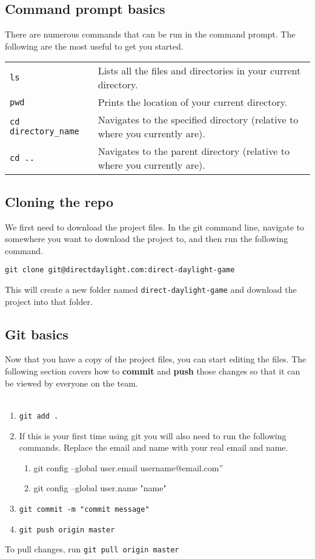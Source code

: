 \documentclass[11pt]{article}
\begin{document}
\subsection{Command prompt basics}
There are numerous commands that can be run in the command prompt. The following are the most useful to get you started.
\begin{center}
\begin{tabular}{ll}
\lstinline!ls! & Lists all the files and directories in your current directory.\\ 
\lstinline!pwd! & Prints the location of your current directory.\\
\lstinline!cd directory_name! & Navigates to the specified directory (relative to where you currently are).\\
\lstinline!cd .. ! & Navigates to the parent directory (relative to where you currently are).\\
\end{tabular} 
\end{center}
\subsection{Cloning the repo}
We first need to download the project files. In the git command line, navigate to somewhere you want to download the project to, and then run the following command.
\begin{lstlisting}
git clone git@directdaylight.com:direct-daylight-game
\end{lstlisting}
This will create a new folder named \lstinline{direct-daylight-game} and download the project into that folder.
\subsection{Git basics}
Now that you have a copy of the project files, you can start editing the files. The following section covers how to \textbf{commit} and \textbf{push }those changes so that it can be viewed by everyone on the team.\\\\

\begin{enumerate}
\item \lstinline{git add .}
\item If this is your first time using git you will also need to run the following commands. Replace the email and name with your real email and name.
\begin{enumerate}
\item git config --global user.email username@email.com''
\item git config --global user.name "name"
\end{enumerate}
\item \lstinline{git commit -m "commit message"}
\item \lstinline{git push origin master}
\end{enumerate}
To pull changes, run \lstinline{git pull origin master}
\end{document}
